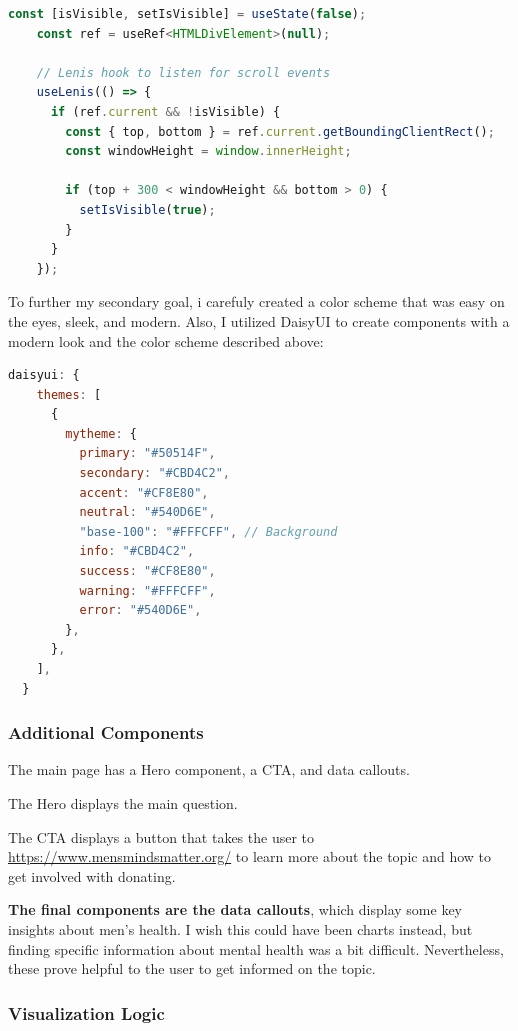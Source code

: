 \documentclass{article}
\begin{document}
\begin{lstlisting}[language=JavaScript]
const [isVisible, setIsVisible] = useState(false);
    const ref = useRef<HTMLDivElement>(null);
  
    // Lenis hook to listen for scroll events
    useLenis(() => {
      if (ref.current && !isVisible) {
        const { top, bottom } = ref.current.getBoundingClientRect();
        const windowHeight = window.innerHeight;
  
        if (top + 300 < windowHeight && bottom > 0) {
          setIsVisible(true);
        }
      }
    });
\end{lstlisting}

To further my secondary goal, i carefuly created a color scheme that was
easy on the eyes, sleek, and modern. Also, I utilized DaisyUI to create 
components with a modern look and the color scheme described above:

\begin{lstlisting}[language=JavaScript]
  daisyui: {
    themes: [
      {
        mytheme: {
          primary: "#50514F",
          secondary: "#CBD4C2",
          accent: "#CF8E80",
          neutral: "#540D6E",
          "base-100": "#FFFCFF", // Background
          info: "#CBD4C2",
          success: "#CF8E80",
          warning: "#FFFCFF",
          error: "#540D6E",
        },
      },
    ],
  }
\end{lstlisting}

\subsubsection{Additional Components}
\label{subsubsec:Components}

The main page has a Hero component, a CTA, and data callouts.

The Hero displays the main question.

The CTA displays a button that takes the user to 
\url{https://www.mensmindsmatter.org/} to learn more about the topic
and how to get involved with donating.

\textbf{The final components are the data callouts}, which display some key insights
about men's health. I wish this could have been charts instead,
but finding specific information about mental health was a bit difficult.
Nevertheless, these prove helpful to the user to get informed on the topic.

\subsubsection{Visualization Logic}
\label{subsubsec:Visualization Logic}
\end{document}
